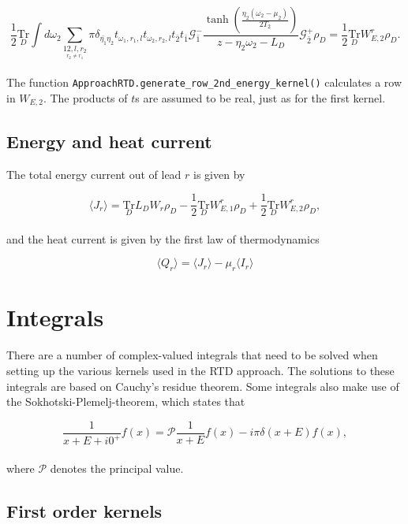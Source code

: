 \documentclass{article}
\newcommand{\G}{\ensuremath{\mathcal{G}}}
\newcommand{\Tru}[1]{\ensuremath{\underset{#1}{\text{Tr}}}}
\begin{document}
\begin{equation}
     \frac{1}{2}\Tru{D} \int d\omega_2\sum_{\underset{r_2\ne r_1}{12,l,r_2}}\pi\delta_{\bar{\eta_1}\eta_2}t_{\omega_1, r_1, l}t_{\omega_2, r_2, l}t_{\bar{2}}t_{\bar{1}}\G^-_{\bar{1}}\frac{\tanh\left ( \frac{\eta_2(\omega_2-\mu_2)}{2T_2} \right )}{z-\eta_2\omega_2-L_D}\G^{+}_{\bar{2}}\rho_D = \frac{1}{2}\Tru{D} W_{E,2}^r\rho_D.
\end{equation}
\\
The function \verb!ApproachRTD.generate_row_2nd_energy_kernel()! calculates a row in $W_{E,2}$. The products of $t$s are assumed to be real, just as for the first kernel.
\subsection{Energy and heat current}

The total energy current out of lead $r$ is given by 

\begin{equation}
    \langle J_r \rangle = \Tru{D} L_D W_r \rho_D - \frac{1}{2}\Tru{D}W_{E,1}^r\rho_D + \frac{1}{2}\Tru{D}W_{E,2}^r\rho_D,
\end{equation}
\\
and the heat current is given by the first law of thermodynamics

\begin{equation}
    \langle Q_r \rangle = \langle J_r \rangle - \mu_r\langle I_r \rangle
\end{equation}
\section{Integrals}
\label{Sec:Integrals}

There are a number of complex-valued integrals that need to be solved when setting up the various kernels used in the RTD approach. The solutions to these integrals are based on Cauchy's residue theorem. Some integrals also make use of the Sokhotski-Plemelj-theorem, which states that

\begin{equation}
    \frac{1}{x+E+i0^+}f(x) = \mathcal{P}\frac{1}{x+E}f(x)-i\pi\delta(x+E)f(x),
\end{equation}
 \\
where $\mathcal{P}$ denotes the principal value.
\subsection{First order kernels}
\end{document}
